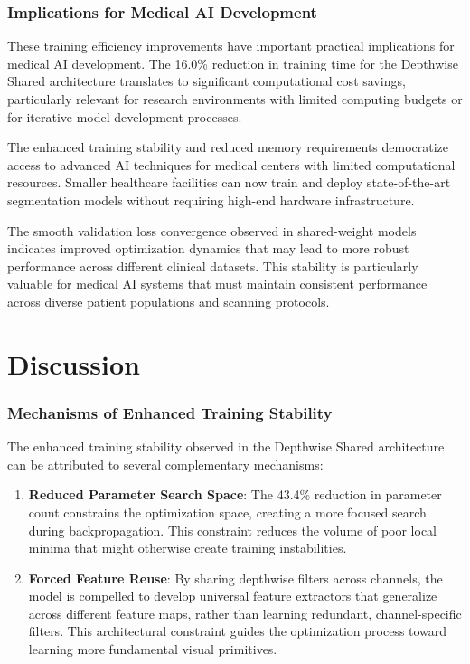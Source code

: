 \documentclass[12pt,a4paper]{article}
\begin{document}
\begin{enumerate}
\subsubsection{Implications for Medical AI Development}

These training efficiency improvements have important practical implications for medical AI development. The 16.0\% reduction in training time for the Depthwise Shared architecture translates to significant computational cost savings, particularly relevant for research environments with limited computing budgets or for iterative model development processes.

The enhanced training stability and reduced memory requirements democratize access to advanced AI techniques for medical centers with limited computational resources. Smaller healthcare facilities can now train and deploy state-of-the-art segmentation models without requiring high-end hardware infrastructure.

The smooth validation loss convergence observed in shared-weight models indicates improved optimization dynamics that may lead to more robust performance across different clinical datasets. This stability is particularly valuable for medical AI systems that must maintain consistent performance across diverse patient populations and scanning protocols.

\section {Discussion}

\subsubsection{Mechanisms of Enhanced Training Stability}

The enhanced training stability observed in the Depthwise Shared architecture can be attributed to several complementary mechanisms:

\begin{enumerate}
\item \textbf{Reduced Parameter Search Space}: The 43.4\% reduction in parameter count constrains the optimization space, creating a more focused search during backpropagation. This constraint reduces the volume of poor local minima that might otherwise create training instabilities.

\item \textbf{Forced Feature Reuse}: By sharing depthwise filters across channels, the model is compelled to develop universal feature extractors that generalize across different feature maps, rather than learning redundant, channel-specific filters. This architectural constraint guides the optimization process toward learning more fundamental visual primitives.


\end{enumerate}
\end{enumerate}
\end{document}
